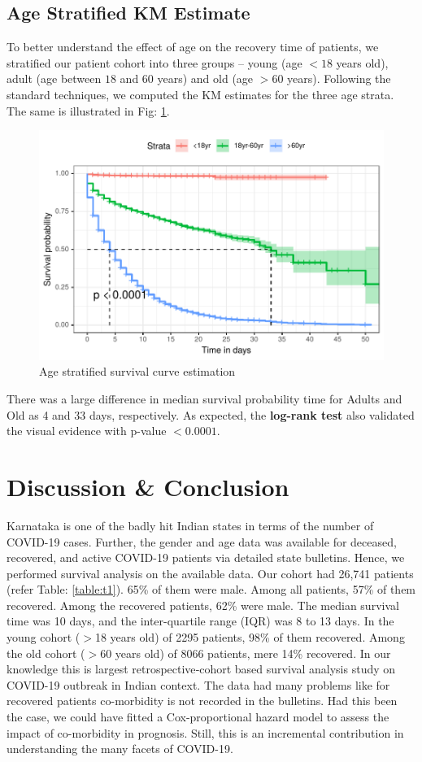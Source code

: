 \documentclass[letterpaper]{article} %
\begin{document}
	\subsection{Age Stratified KM Estimate} To better understand the effect of age on the recovery time of patients, we stratified our patient cohort into three groups -- young (age $<18$ years old), adult (age between $18$ and $60$ years) and old (age $>$60 years).  Following the standard techniques, we computed the KM estimates for the three age strata. The same is illustrated in Fig: \ref{fig:3quant}. 
	
	\begin{figure}[h!]
		\centering
		\includegraphics[width=0.97\linewidth]{3-age}
		\caption{Age stratified survival curve estimation}
		\label{fig:3quant}
	\end{figure}
	
	There was a large difference in median survival probability time  for {Adults and Old as 4 and 33 days}, respectively.  
	As expected, the \textbf{log-rank test} also validated the visual evidence with p-value $<0.0001$. 
	\section{Discussion \& Conclusion}
	
	Karnataka is one of the badly hit Indian states in terms of the number of COVID-19 cases. Further, the gender and age data was available for deceased, recovered, and active COVID-19 patients via detailed state bulletins. Hence, we performed survival analysis on the available data. Our cohort had 26,741 patients (refer Table: \ref{table:t1}). 65\% of them were male. Among all patients, 57\% of them recovered.
	Among the recovered patients, 62\% were male. The median survival time was 10 days, and the inter-quartile range (IQR) was 8 to 13 days.
	In the young cohort ($>$18 years old) of 2295 patients, 98\% of them recovered.
	Among the old cohort ($>$60 years old) of 8066 patients, mere 14\% recovered.
	In our knowledge this is largest  retrospective‐cohort based survival analysis \cite{clark2003survival} study on COVID-19 outbreak in Indian context. The data had many problems like for recovered patients co-morbidity is not recorded in the bulletins. Had this been the case, we could have fitted a Cox-proportional hazard model to assess the impact of co-morbidity in prognosis. 
	Still, this is an incremental contribution in understanding the many facets of COVID-19. 
	
\end{document}

